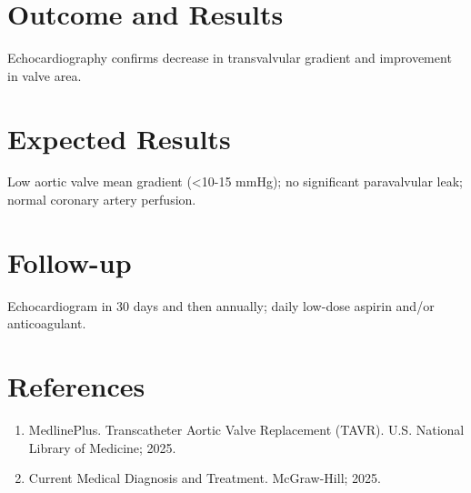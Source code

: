 \section*{Outcome and Results}
Echocardiography confirms decrease in transvalvular gradient and improvement in valve area.

\section*{Expected Results}
Low aortic valve mean gradient (<10-15 mmHg); no significant paravalvular leak; normal coronary artery perfusion.

\section*{Follow-up}
Echocardiogram in 30 days and then annually; daily low-dose aspirin and/or anticoagulant.

\section*{References}
\begin{enumerate}
  \item MedlinePlus. Transcatheter Aortic Valve Replacement (TAVR). U.S. National Library of Medicine; 2025.
  \item Current Medical Diagnosis and Treatment. McGraw-Hill; 2025.
\end{enumerate}

\clearpage
